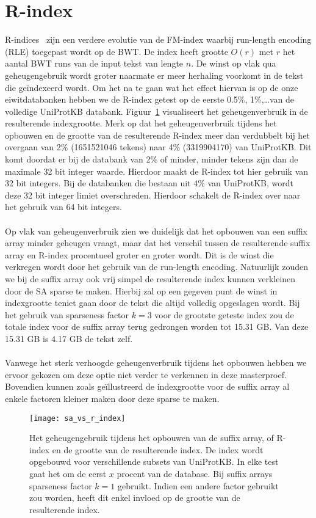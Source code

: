 \section{R-index}
R-indices~\cite{r_index1, r_index2} zijn een verdere evolutie van de FM-index waarbij run-length encoding (RLE) toegepast wordt op de BWT\@.
De index heeft grootte $O(r)$ met $r$ het aantal BWT runs van de input tekst van lengte $n$.
De winst op vlak qua geheugengebruik wordt groter naarmate er meer herhaling voorkomt in de tekst die geïndexeerd wordt.
Om het na te gaan wat het effect hiervan is op de onze eiwitdatabanken hebben we de R-index getest op de eerste 0.5\%, 1\%,\ldots van de volledige UniProtKB databank.
Figuur~\ref{fig:sa_vs_r_index} visualiseert het geheugenverbruik in de resulterende indexgrootte.
Merk op dat het geheugenverbruik tijdens het opbouwen en de grootte van de resulterende R-index meer dan verdubbelt bij het overgaan van 2\% (1651521046 tekens) naar 4\% (3319904170) van UniProtKB\@.
Dit komt doordat er bij de databank van 2\% of minder, minder tekens zijn dan de maximale 32 bit integer waarde.
Hierdoor maakt de R-index tot hier gebruik van 32 bit integers.
Bij de databanken die bestaan uit 4\% van UniProtKB, wordt deze 32 bit integer limiet overschreden.
Hierdoor schakelt de R-index over naar het gebruik van 64 bit integers.
\\ \\
Op vlak van geheugenverbruik zien we duidelijk dat het opbouwen van een suffix array minder geheugen vraagt, maar dat het verschil tussen de resulterende suffix array en R-index procentueel groter en groter wordt.
Dit is de winst die verkregen wordt door het gebruik van de run-length encoding.
Natuurlijk zouden we bij de suffix array ook vrij simpel de resulterende index kunnen verkleinen door de SA sparse te maken.
Hierbij zal op een gegeven punt de winst in indexgrootte teniet gaan door de tekst die altijd volledig opgeslagen wordt.
Bij het gebruik van sparseness factor $k = 3$ voor de grootste geteste index zou de totale index voor de suffix array terug gedrongen worden tot 15.31 GB\@.
Van deze 15.31 GB is 4.17 GB de tekst zelf.
\\ \\
Vanwege het sterk verhoogde geheugenverbruik tijdens het opbouwen hebben we ervoor gekozen om deze optie niet verder te verkennen in deze masterproef.
Bovendien kunnen zoals geïllustreerd de indexgrootte voor de suffix array al enkele factoren kleiner maken door deze sparse te maken.

\begin{figure}
    \centering
    \texttt{[image: sa\_vs\_r\_index]}
    \caption{Het geheugengebruik tijdens het opbouwen van de suffix array, of R-index en de grootte van de resulterende index. De index wordt opgebouwd voor verschillende subsets van UniProtKB. In elke test gaat het om de eerst $x$ procent van de database. Bij suffix arrays sparseness factor $k = 1$ gebruikt. Indien een andere factor gebruikt zou worden, heeft dit enkel invloed op de grootte van de resulterende index.}
    \label{fig:sa_vs_r_index}
\end{figure}

